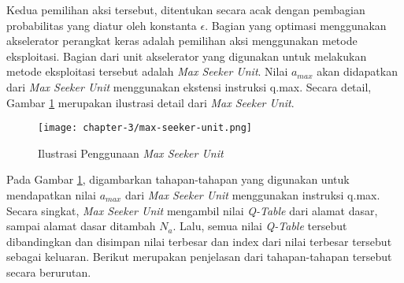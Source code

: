 Kedua pemilihan aksi tersebut, ditentukan secara acak dengan pembagian probabilitas yang diatur oleh konstanta $\epsilon$. Bagian yang optimasi menggunakan akselerator perangkat keras adalah pemilihan aksi menggunakan metode eksploitasi. Bagian dari unit akselerator yang digunakan untuk melakukan metode eksploitasi tersebut adalah \textit{Max Seeker Unit}. Nilai $a_{max}$ akan didapatkan dari \textit{Max Seeker Unit} menggunakan ekstensi instruksi q.max. Secara detail, Gambar \ref{fig:max-seeker-unit} merupakan ilustrasi detail dari \textit{Max Seeker Unit}.

\begin{figure}[H]
	\centering
	\texttt{[image: chapter-3/max-seeker-unit.png]}
	\caption{Ilustrasi Penggunaan \textit{Max Seeker Unit}}
	\label{fig:max-seeker-unit}
\end{figure}

Pada Gambar \ref{fig:max-seeker-unit}, digambarkan tahapan-tahapan yang digunakan untuk mendapatkan nilai $a_{max}$ dari \textit{Max Seeker Unit} menggunakan instruksi q.max. Secara singkat, \textit{Max Seeker Unit} mengambil nilai \textit{Q-Table} dari alamat dasar, sampai alamat dasar ditambah $N_a$. Lalu, semua nilai \textit{Q-Table} tersebut dibandingkan dan disimpan nilai terbesar dan index dari nilai terbesar tersebut sebagai keluaran. Berikut merupakan penjelasan dari tahapan-tahapan tersebut secara berurutan.

